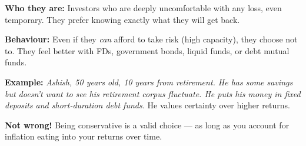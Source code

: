 \documentclass[12pt,a4paper]{article}
\newcommand{\faShield}{\ding{110}}
\newcommand{\faBalanceScale}{\ding{202}}
\newcommand{\faRocket}{\ding{225}}
\begin{document}
\begin{center}
\end{center}

\vspace{3mm}

\begin{tcolorbox}[base, colback=Conservative!8, colframe=Conservative,
  title={\faShield\;\textbf{Conservative (Low Tolerance)}},
  fonttitle=\bfseries\color{white}, colbacktitle=Conservative]

\textbf{Who they are:} Investors who are deeply uncomfortable with any loss, even temporary. They prefer knowing exactly what they will get back.

\medskip
\textbf{Behaviour:} Even if they \textit{can} afford to take risk (high capacity), they choose not to. They feel better with FDs, government bonds, liquid funds, or debt mutual funds.

\medskip
\textbf{Example:} \textit{Ashish, 50 years old, 10 years from retirement. He has some savings but doesn't want to see his retirement corpus fluctuate. He puts his money in fixed deposits and short-duration debt funds.} He values certainty over higher returns.

\medskip
\textbf{Not wrong!} Being conservative is a valid choice --- as long as you account for inflation eating into your returns over time.
\end{tcolorbox}
\end{document}
